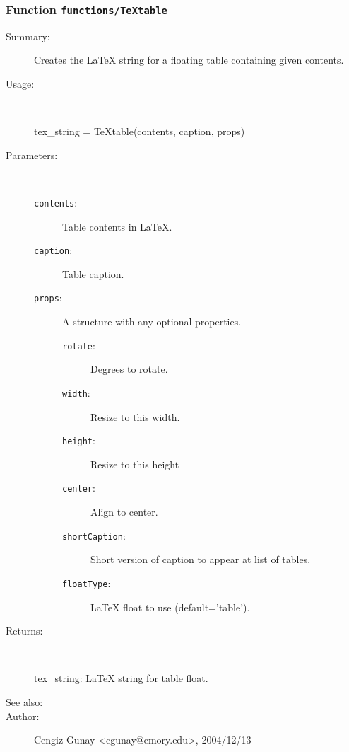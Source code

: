 \subsubsection[Function \texttt{TeXtable}]{Function \texttt{functions/TeXtable}}%
%
\label{ref_functions__TeXtable}%
\hypertarget{ref_functions__TeXtable}{}%
\begin{description}
\item[Summary:]Creates the LaTeX string for a floating table containing given contents.
%
\item[Usage:]~%
\begin{lyxcode}%
tex\_string = TeXtable(contents, caption, props)
%
\end{lyxcode}%
%
%
\item[Parameters:]~
\begin{description}%
\item[\texttt{contents}:]
 Table contents in LaTeX.
\item[\texttt{caption}:]
 Table caption.
\item[\texttt{props}:]
 A structure with any optional properties.
\begin{description}%
\item[\texttt{rotate}:]
 Degrees to rotate.
\item[\texttt{width}:]
 Resize to this width.
\item[\texttt{height}:]
 Resize to this height
\item[\texttt{center}:]
 Align to center.
\item[\texttt{shortCaption}:]
 Short version of caption to appear at list of tables.
\item[\texttt{floatType}:]
 LaTeX float to use (default='table').
\end{description}%
\end{description}%
%
\item[Returns:]~

	tex\_string: LaTeX string for table float.
%
%
\item[See also:]%
%
\item[Author:]%
Cengiz Gunay <cgunay@emory.edu>, 2004/12/13%
\end{description}
\methodline%

